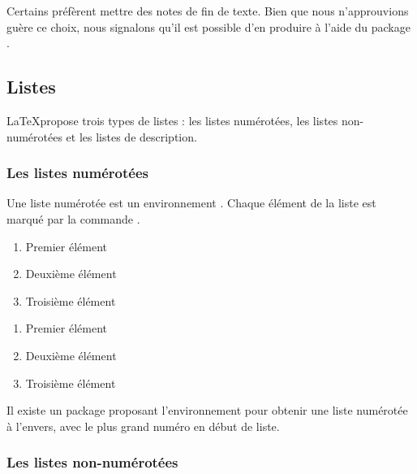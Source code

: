 \begin{plusloins}
    Certains préfèrent mettre des notes de fin de texte. Bien que nous n'approuvions guère ce choix, nous signalons qu'il est possible d'en produire à l'aide du package .
\end{plusloins}

\subsection{Listes}

\LaTeX propose trois types de listes : les listes numérotées, les listes non-numérotées et les listes de description.

\subsubsection{Les listes numérotées}

Une liste numérotée est un environnement .
Chaque élément de la liste est marqué par la commande .

\begin{latexcode}
\begin{enumerate}
    \item Premier élément
    \item Deuxième élément
    \item Troisième élément
\end{enumerate}
\end{latexcode}

\begin{quotation*}
\begin{enumerate}
    \item Premier élément
    \item Deuxième élément
    \item Troisième élément
\end{enumerate}
\end{quotation*}

\begin{plusloins}
Il existe un package  proposant l'environnement   pour obtenir une liste numérotée à l'envers, avec le plus grand numéro en début de liste.

\end{plusloins}
\subsubsection{Les listes non-numérotées}

